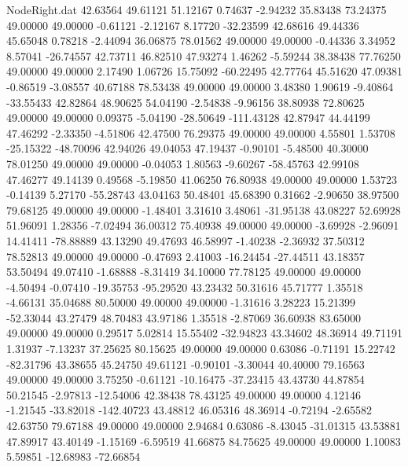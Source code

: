 \begin{filecontents}{NodeRight.dat}
  42.63564   49.61121   51.12167     0.74637   -2.94232   35.83438   73.24375   49.00000   49.00000   -0.61121   -2.12167    8.17720  -32.23599
  42.68616   49.44336   45.65048     0.78218   -2.44094   36.06875   78.01562   49.00000   49.00000   -0.44336    3.34952    8.57041  -26.74557
  42.73711   46.82510   47.93274     1.46262   -5.59244   38.38438   77.76250   49.00000   49.00000    2.17490    1.06726   15.75092  -60.22495
  42.77764   45.51620   47.09381    -0.86519   -3.08557   40.67188   78.53438   49.00000   49.00000    3.48380    1.90619   -9.40864  -33.55433
  42.82864   48.90625   54.04190    -2.54838   -9.96156   38.80938   72.80625   49.00000   49.00000    0.09375   -5.04190  -28.50649 -111.43128
  42.87947   44.44199   47.46292    -2.33350   -4.51806   42.47500   76.29375   49.00000   49.00000    4.55801    1.53708  -25.15322  -48.70096
  42.94026   49.04053   47.19437    -0.90101   -5.48500   40.30000   78.01250   49.00000   49.00000   -0.04053    1.80563   -9.60267  -58.45763
  42.99108   47.46277   49.14139     0.49568   -5.19850   41.06250   76.80938   49.00000   49.00000    1.53723   -0.14139    5.27170  -55.28743
  43.04163   50.48401   45.68390     0.31662   -2.90650   38.97500   79.68125   49.00000   49.00000   -1.48401    3.31610    3.48061  -31.95138
  43.08227   52.69928   51.96091     1.28356   -7.02494   36.00312   75.40938   49.00000   49.00000   -3.69928   -2.96091   14.41411  -78.88889
  43.13290   49.47693   46.58997    -1.40238   -2.36932   37.50312   78.52813   49.00000   49.00000   -0.47693    2.41003  -16.24454  -27.44511
  43.18357   53.50494   49.07410    -1.68888   -8.31419   34.10000   77.78125   49.00000   49.00000   -4.50494   -0.07410  -19.35753  -95.29520
  43.23432   50.31616   45.71777     1.35518   -4.66131   35.04688   80.50000   49.00000   49.00000   -1.31616    3.28223   15.21399  -52.33044
  43.27479   48.70483   43.97186     1.35518   -2.87069   36.60938   83.65000   49.00000   49.00000    0.29517    5.02814   15.55402  -32.94823
  43.34602   48.36914   49.71191     1.31937   -7.13237   37.25625   80.15625   49.00000   49.00000    0.63086   -0.71191   15.22742  -82.31796
  43.38655   45.24750   49.61121    -0.90101   -3.30044   40.40000   79.16563   49.00000   49.00000    3.75250   -0.61121  -10.16475  -37.23415
  43.43730   44.87854   50.21545    -2.97813  -12.54006   42.38438   78.43125   49.00000   49.00000    4.12146   -1.21545  -33.82018 -142.40723
  43.48812   46.05316   48.36914    -0.72194   -2.65582   42.63750   79.67188   49.00000   49.00000    2.94684    0.63086   -8.43045  -31.01315
  43.53881   47.89917   43.40149    -1.15169   -6.59519   41.66875   84.75625   49.00000   49.00000    1.10083    5.59851  -12.68983  -72.66854

\end{filecontents}
